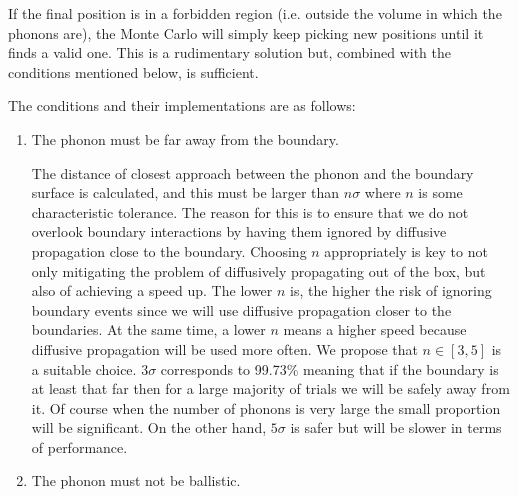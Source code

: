 \documentclass[11pt]{article}
\begin{document}
If the final position is in a forbidden region (i.e. outside the volume in which the phonons are), the Monte Carlo will simply keep picking new positions
until it finds a valid one. This is a rudimentary solution but, combined with the conditions mentioned below, is sufficient.

The conditions and their implementations are as follows:
\begin{enumerate}
\item The phonon must be far away from the boundary.

The distance of closest approach between the phonon and the boundary surface is calculated, and this must be larger than $n \sigma$ where
$n$ is some characteristic tolerance. 
The reason for this is to ensure that we do not overlook boundary interactions by having them ignored by diffusive propagation close to the
boundary. Choosing $n$ appropriately is key to not only mitigating the problem of diffusively propagating out of the box, but also of achieving a
speed up. The lower $n$ is, the higher the risk of ignoring boundary events since we will use diffusive propagation closer to the boundaries. At the
same time, a lower $n$ means a higher speed because diffusive propagation will be used more often. We propose that $n \in [3, 5]$ is a suitable
choice. $3\sigma$ corresponds to 99.73\% meaning that if the boundary is at least that far then for a large majority of trials we will be safely away
from it. Of course when the number of phonons is very large the small proportion will be significant. On the other hand, $5\sigma$ is safer but will 
be slower in terms of performance. 

\item The phonon must not be ballistic.


\end{enumerate}
\end{document}
